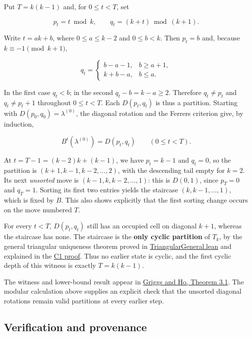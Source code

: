 \documentclass[11pt,a4paper]{article}
\begin{document}
Put \(T=k(k-1)\) and, for \(0\le t<T\), set

\[
p_t=t\bmod k,\qquad q_t=(k+t)\bmod(k+1).
\]

Write \(t=ak+b\), where \(0\le a\le k-2\) and \(0\le b<k\). Then \(p_t=b\) and, because \(k\equiv-1\pmod{k+1}\),

\[
q_t=\begin{cases}
b-a-1,&b\ge a+1,\\
k+b-a,&b\le a.
\end{cases}
\]

In the first case \(q_t<b\); in the second \(q_t-b=k-a\ge2\). Therefore \(q_t\ne p_t\) and \(q_t\ne p_t+1\) throughout \(0\le t<T\). Each \(D(p_t,q_t)\) is thus a partition. Starting with \(D(p_0,q_0)=\lambda^{(0)}\), the diagonal rotation and the Ferrers criterion give, by induction,

\[
B^t(\lambda^{(0)})=D(p_t,q_t)\qquad(0\le t<T).
\]

At \(t=T-1=(k-2)k+(k-1)\), we have \(p_t=k-1\) and \(q_t=0\), so the partition is \((k+1,k-1,k-2,\ldots,2)\), with the descending tail empty for \(k=2\). Its next \emph{unsorted} move is \((k-1,k,k-2,\ldots,1)\): this is \(D(0,1)\), since \(p_T=0\) and \(q_T=1\). Sorting its first two entries yields the staircase \((k,k-1,\ldots,1)\), which is fixed by \(B\). This also shows explicitly that the first sorting change occurs on the move numbered \(T\).

For every \(t<T\), \(D(p_t,q_t)\) still has an occupied cell on diagonal \(k+1\), whereas the staircase has none. The staircase is the \textbf{only cyclic partition} of \(T_k\), by the general triangular uniqueness theorem proved in \href{https://github.com/mpelteshki/climbing-to-the-frontier/blob/212bba53b1818c08c40b8c4b48f636651eaf6410/cagent/p3/lean/ProofPursuit/P3/TriangularGeneral.lean}{TriangularGeneral.lean} and explained in the \href{https://github.com/mpelteshki/climbing-to-the-frontier/blob/212bba53b1818c08c40b8c4b48f636651eaf6410/cagent/p3/c1/written-proof.md}{C1 proof}. Thus no earlier state is cyclic, and the first cyclic depth of this witness is exactly \(T=k(k-1)\).

The witness and lower-bound result appear in \href{https://sc.edu/study/colleges_schools/artsandsciences/mathematics/research/imi/research/documents/1998/1998_12.pdf}{Griggs and Ho, Theorem 3.1}. The modular calculation above supplies an explicit check that the unsorted diagonal rotations remain valid partitions at every earlier step.

\subsection{Verification and provenance}\label{verification-and-provenance}
\end{document}
